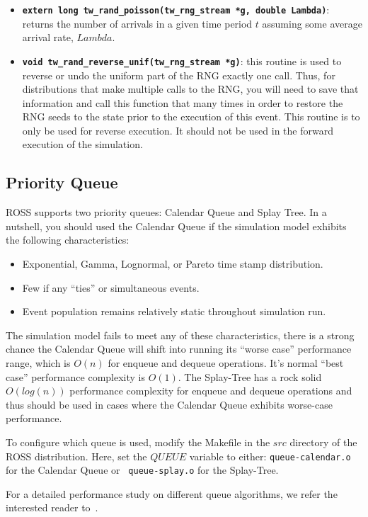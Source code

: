 \documentclass[12pt]{article}
\begin{document}
\begin{itemize}
\item {\tt\bf extern long tw\_rand\_poisson(tw\_rng\_stream *g, double
  Lambda)}: returns the number of arrivals in a given time period $t$ assuming
  some average arrival rate, $Lambda$.

\item {\tt\bf void tw\_rand\_reverse\_unif(tw\_rng\_stream *g)}: this routine
  is used to reverse or undo the uniform part of the RNG exactly one
  call. Thus, for distributions that make multiple calls to the RNG, you will
  need to save that information and call this function that many times in
  order to restore the RNG seeds to the state prior to the execution of this
  event. This routine is to only be used for reverse execution. It should not
  be used in the forward execution of the simulation.
\end{itemize}

\subsection{Priority Queue}
ROSS supports two priority queues: Calendar Queue and Splay Tree.
In a nutshell, you should used the Calendar Queue if the simulation
model exhibits the following characteristics:

\begin{itemize}
\item Exponential, Gamma, Lognormal, or Pareto time stamp distribution.
\item Few if any ``ties'' or simultaneous events.
\item Event population remains relatively static throughout
simulation run.
\end{itemize}

The simulation model fails to meet any of these characteristics, there
is a strong chance the Calendar Queue will shift into running its
``worse case'' performance range, which is $O(n)$ for enqueue and
dequeue operations. It's normal ``best case'' performance complexity
is $O(1)$. The Splay-Tree has a rock solid $O(log(n))$ performance
complexity for enqueue and dequeue operations and thus should be used
in cases where the Calendar Queue exhibits worse-case performance.

To configure which queue is used, modify the Makefile in the $src$
directory of the ROSS distribution. Here, set the $QUEUE$ variable to
either: {\tt queue-calendar.o} for the Calendar Queue or {\tt
queue-splay.o} for the Splay-Tree.

For a detailed performance study on different queue algorithms,
we refer the interested reader to~\cite{ronngren-tomacs-1997}.
\end{document}
